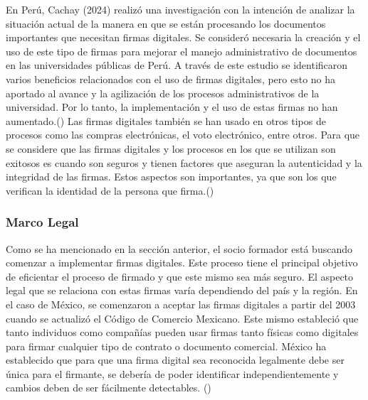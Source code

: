 \documentclass[12pt]{article}
\begin{document}
En Perú, Cachay (2024) realizó una investigación con la intención de analizar la situación actual de la manera en que se están procesando los documentos importantes que necesitan firmas digitales. Se consideró necesaria la creación y el uso de este tipo de firmas para mejorar el manejo administrativo de documentos en las universidades públicas de Perú. A través de este estudio se identificaron varios beneficios relacionados con el uso de firmas digitales, pero esto no ha aportado al avance y la agilización de los procesos administrativos de la universidad. Por lo tanto, la implementación y el uso de estas firmas no han aumentado.(\cite{Cachay:2024}) Las firmas digitales también se han usado en otros tipos de procesos como las compras electrónicas, el voto electrónico, entre otros. Para que se considere que las firmas digitales y los procesos en los que se utilizan son exitosos es cuando son seguros y tienen factores que aseguran la autenticidad y la integridad de las firmas. Estos aspectos son importantes, ya que son los que verifican la identidad de la persona que firma.(\cite{Roy:2012})
\subsubsection{Marco Legal}
Como se ha mencionado en la sección anterior, el socio formador está buscando comenzar a implementar firmas digitales. Este proceso tiene el principal objetivo de eficientar el proceso de firmado y que este mismo sea más seguro. El aspecto legal que se relaciona con estas firmas varía dependiendo del país y la región. En el caso de México, se comenzaron a aceptar las firmas digitales a partir del 2003 cuando se actualizó el Código de Comercio Mexicano. Este mismo estableció que tanto individuos como compañías pueden usar firmas tanto físicas como digitales para firmar cualquier tipo de contrato o documento comercial. México ha establecido que para que una firma digital sea reconocida legalmente debe ser única para el firmante, se debería de poder identificar independientemente y cambios deben de ser fácilmente detectables. (\cite{SSL:2024})

\newpage
\printbibliography
\end{document}
